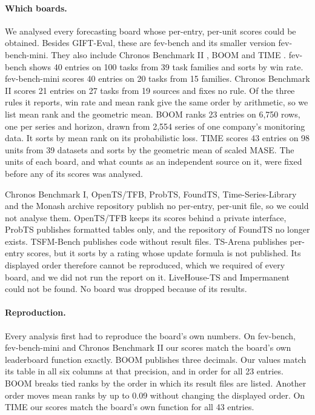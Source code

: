 \documentclass{article}
\begin{document}
\paragraph{Which boards.} We analysed every forecasting board whose per-entry, per-unit scores
could be obtained. Besides GIFT-Eval, these are fev-bench \citep{fevbench} and its smaller
version fev-bench-mini. They also include Chronos Benchmark II \citep{chronos}, BOOM
\citep{boom} and TIME \citep{timebench}. fev-bench shows 40 entries on 100 tasks from 39 task families and sorts by
win rate. fev-bench-mini scores 40 entries on 20 tasks from 15 families. Chronos Benchmark II
scores 21 entries on 27 tasks from 19 sources and fixes no rule. Of the three rules it reports,
win rate and mean rank give the same order by arithmetic, so we list mean rank and the
geometric mean. BOOM ranks 23 entries on 6,750 rows, one per series and horizon, drawn from
2,554 series of one company's monitoring data. It sorts by mean rank on its probabilistic loss.
TIME scores 43 entries on 98 units from 39 datasets and sorts by the geometric mean of scaled
MASE. The units of each board, and what counts as an independent source on it, were fixed
before any of its scores was analysed.

Chronos Benchmark I, OpenTS/TFB, ProbTS, FoundTS, Time-Series-Library and the Monash archive
repository publish no per-entry, per-unit file, so we could not analyse them. OpenTS/TFB keeps
its scores behind a private interface, ProbTS publishes formatted tables only, and the
repository of FoundTS no longer exists. TSFM-Bench publishes code without result files.
TS-Arena publishes per-entry scores, but it sorts by a rating whose update formula is not
published. Its displayed order therefore cannot be reproduced, which we required of every
board, and we did not run the report on it. LiveHouse-TS and Impermanent could not be found.
No board was dropped because of its results.

\paragraph{Reproduction.} Every analysis first had to reproduce the board's own numbers. On
fev-bench, fev-bench-mini and Chronos Benchmark II our scores match the board's own leaderboard
function exactly. BOOM publishes three decimals. Our values match its table in all six columns
at that precision, and in order for all 23 entries. BOOM breaks tied ranks by the order in
which its result files are listed. Another order moves mean ranks by up to 0.09 without
changing the displayed order. On TIME our scores match the board's own function for all 43
entries.
\end{document}
